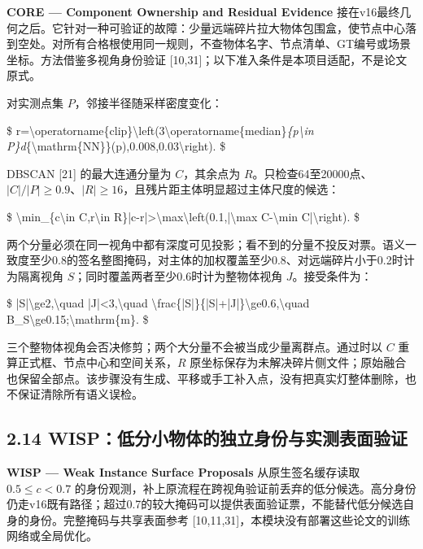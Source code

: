 \documentclass[UTF8,fontset=fandol]{ctexart}
\begin{document}
\textbf{CORE — Component Ownership and Residual Evidence} 接在v16最终几何之后。它针对一种可验证的故障：少量远端碎片拉大物体包围盒，使节点中心落到空处。对所有合格根使用同一规则，不查物体名字、节点清单、GT编号或场景坐标。方法借鉴多视角身份验证 [10,31]；以下准入条件是本项目适配，不是论文原式。



对实测点集 $P$，邻接半径随采样密度变化：



\$
r=\textbackslash{}operatorname\{clip\}\textbackslash{}left(3\textbackslash{}operatorname\{median\}\emph{\{p\textbackslash{}in P\}d}\{\textbackslash{}mathrm\{NN\}\}(p),0.008,0.03\textbackslash{}right).
\$



DBSCAN [21] 的最大连通分量为 $C$，其余点为 $R$。只检查64至20000点、$|C|/|P|\ge0.9$、$|R|\ge16$，且残片距主体明显超过主体尺度的候选：



\$
\textbackslash{}min\_\{c\textbackslash{}in C,r\textbackslash{}in R\}|c-r|>\textbackslash{}max\textbackslash{}left(0.1,|\textbackslash{}max C-\textbackslash{}min C|\textbackslash{}right).
\$



两个分量必须在同一视角中都有深度可见投影；看不到的分量不投反对票。语义一致度至少0.8的签名整图掩码，对主体的加权覆盖至少0.8、对远端碎片小于0.2时计为隔离视角 $S$；同时覆盖两者至少0.6时计为整物体视角 $J$。接受条件为：



\$
|S|\textbackslash{}ge2,\textbackslash{}quad |J|<3,\textbackslash{}quad \textbackslash{}frac\{|S|\}\{|S|+|J|\}\textbackslash{}ge0.6,\textbackslash{}quad B\_S\textbackslash{}ge0.15;\textbackslash{}mathrm\{m\}.
\$



三个整物体视角会否决修剪；两个大分量不会被当成少量离群点。通过时以 $C$ 重算正式框、节点中心和空间关系，$R$ 原坐标保存为未解决碎片侧文件；原始融合也保留全部点。该步骤没有生成、平移或手工补入点，没有把真实灯整体删除，也不保证清除所有语义误检。



\subsection*{2.14 WISP：低分小物体的独立身份与实测表面验证}

\textbf{WISP — Weak Instance Surface Proposals} 从原生签名缓存读取 $0.5\le c<0.7$ 的身份观测，补上原流程在跨视角验证前丢弃的低分候选。高分身份仍走v16既有路径；超过0.7的较大掩码可以提供表面验证票，不能替代低分候选自身的身份。完整掩码与共享表面参考 [10,11,31]，本模块没有部署这些论文的训练网络或全局优化。
\end{document}
